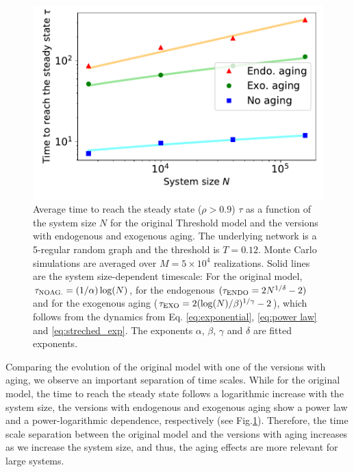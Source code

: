 \begin{figure}
\includegraphics[width=0.95\columnwidth]{Figs/Aging_Threshold/time_steady.pdf}
\caption[Average time to reach the steady state $\tau$]{\label{fig:time_steady} Average time to reach the steady state ($\rho > 0.9$) $\tau$ as a function of the system size $N$ for the original Threshold model and the versions with endogenous and exogenous aging. The underlying network is a 5-regular random graph and the threshold is $T = 0.12$. Monte Carlo simulations are averaged over $M = 5 \times 10^4$ realizations. Solid lines are the system size-dependent timescale: For the original model, $\tau_{\rm{NO AG.}} = (1/\alpha)\log(N)$, for the endogenous $(\tau_{\rm{ENDO}} = 2N^{1/\delta} - 2)$ and for the exogenous aging ($\tau_{\rm{EXO}} = 2(\log(N)/\beta)^{1/\gamma} - 2$), which follows from the dynamics from Eq. \eqref{eq:exponential}, \eqref{eq:power law} and \eqref{eq:streched_exp}. The exponents $\alpha$, $\beta$, $\gamma$ and $\delta$ are fitted exponents.}
\end{figure}

Comparing the evolution of the original model with one of the versions with aging, we observe an important separation of time scales. While for the original model, the time to reach the steady state follows a logarithmic increase with the system size, the versions with endogenous and exogenous aging show a power law and a power-logarithmic dependence, respectively (see Fig.\ref{fig:time_steady}). Therefore, the time scale separation between the original model and the versions with aging increases as we increase the system size, and thus, the aging effects are more relevant for large systems.

